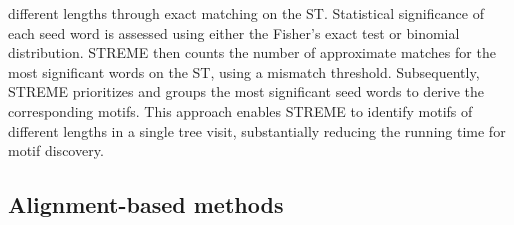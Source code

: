 \documentclass[a4paper, titlepage, openright]{book}
\begin{document}
different lengths through exact matching on the ST. Statistical significance of each seed word is assessed using either the Fisher’s exact test or binomial distribution. STREME then counts the number of approximate matches for the most significant words on the ST, using a mismatch threshold. Subsequently, STREME prioritizes and groups the most significant seed words to derive the corresponding motifs. This approach enables STREME to identify motifs of different lengths in a single tree visit, substantially reducing the running time for motif discovery.

\subsection{Alignment-based methods}\label{subsection:alignment-methods-appendix}
\end{document}

